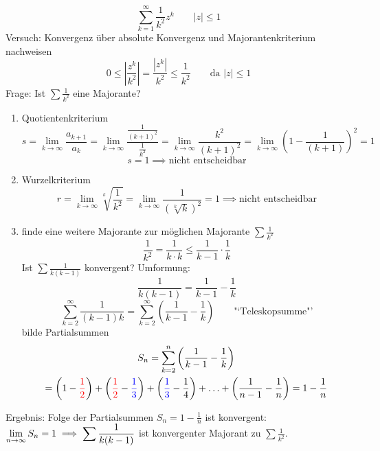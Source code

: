 \begin{example}
	\[
		\sum_{k=1}^\infty \frac{1}{k^2}z^k \qquad |z|\leq1
	\]
	Versuch: Konvergenz über absolute Konvergenz und Majorantenkriterium nachweisen
	\[
		0 \leq \left|\frac{z^k}{k^2}\right|=\frac{|z^k|}{k^2}\leq\frac{1}{k^2}\qquad \text{da } |z|\leq1
	\]
	Frage: Ist \( \sum\frac{1}{k^2} \) eine Majorante?
	
	\begin{enumerate}
		\item Quotientenkriterium 
		\[
		   s=\lim_{k\rightarrow\infty}\frac{a_{k+1}}{a_k}
			=\lim_{k\rightarrow\infty}\frac{\frac{1}{(k+1)^2}}{\frac{1}{k^2}}
			=\lim_{k\rightarrow\infty}\frac{k^2}{(k+1)^2}
			=\lim_{k\rightarrow\infty}\left(1-\frac{1}{(k+1)}\right)^2 
			= 1 
		\]
		\[
			s = 1 \implies \text{nicht entscheidbar} 
		\]
		\item Wurzelkriterium
		\[
		   r=\lim_{k\rightarrow\infty}\sqrt[k]{\frac{1}{k^2}}
			=\lim_{k\rightarrow\infty}\frac{1}{(\sqrt[k]{k})^2}
			= 1 \implies  \text{nicht entscheidbar}
		\]
		\item finde eine weitere Majorante zur möglichen Majorante \( \sum\frac{1}{k^2} \)
		\[
			\frac{1}{k^2}= \frac{1}{k\cdot k}\leq \frac{1}{k-1}\cdot\frac{1}{k}
		\]
		Ist \( \sum\frac{1}{k(k-1)} \) konvergent? Umformung:
		\[
			\frac{1}{k(k-1)}=\frac{1}{k-1}-\frac{1}{k}
		\]
		\[
			\sum_{k=2}^\infty\frac{1}{(k-1)k}=\sum_{k=2}^\infty\left(\frac{1}{k-1}-\frac{1}{k}\right) \qquad \text{"`Teleskopsumme"'}
		\]
		bilde Partialsummen
		\begin{multline*}
			S_n=\sum_{k=2}^n\left(\frac{1}{k-1}-\frac{1}{k}\right)\\=\left(1-{\color{red}\frac{1}{2}}\right)+\left({\color{red}\frac{1}{2}}-{\color{blue}\frac{1}{3}}\right)+\left({\color{blue}\frac{1}{3}}-\frac{1}{4}\right)+\ldots+\left(\frac{1}{n-1}-\frac{1}{n}\right)=1-\frac{1}{n}
		\end{multline*}
	\end{enumerate}
	Ergebnis: Folge der Partialsummen \( S_n = 1- \frac{1}{n}\) ist konvergent: \( \displaystyle\lim_{n\rightarrow\infty} S_n=1 \implies \sum\frac{1}{k(k-1)} \) ist konvergenter Majorant zu \( \sum\frac{1}{k^2} \).
\end{example}
